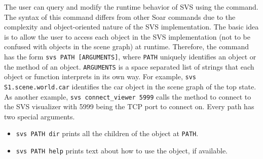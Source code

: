 The user can query and modify the runtime behavior of SVS using the  command.
The syntax of this command differs from other Soar commands due to the complexity and object-oriented nature of the SVS implementation.
The basic idea is to allow the user to access each object in the SVS implementation (not to be confused with objects in the scene graph) at runtime.
Therefore, the command has the form \texttt{svs PATH [ARGUMENTS]}, where \texttt{PATH} uniquely identifies an object or the method of an object.
\texttt{ARGUMENTS} is a space separated list of strings that each object or function interprets in its own way.
For example, \texttt{svs S1.scene.world.car} identifies the car object 
in the scene graph of the top state.
As another example, \verb|svs connect_viewer 5999| calls the method to connect to the SVS visualizer with 5999 being the TCP port to connect on.
Every path has two special arguments.

\begin{itemize}
\item{\texttt{svs PATH dir}} prints all the children of the object at \texttt{PATH}.
\item{\texttt{svs PATH help}} prints text about how to use the object, if available.
\end{itemize}

